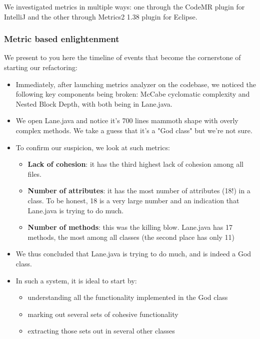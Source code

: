 We investigated metrics in multiple ways: one through the CodeMR plugin for IntelliJ and the other through Metrics2 1.38 plugin for Eclipse.

\subsubsection{Metric based enlightenment}

We present to you here the timeline of events that become the cornerstone of starting our refactoring:

\begin{itemize}

\item Immediately, after launching metrics analyzer on the codebase, we noticed the following key components being broken: McCabe cyclomatic complexity and Nested Block Depth, with both being in Lane.java.
\item We open Lane.java and notice it's 700 lines mammoth shape with overly complex methods. We take a guess that it's a "God class" but we're not sure.
\item To confirm our suspicion, we look at such metrics:

\begin{itemize}
\item \textbf{Lack of cohesion}: it has the third highest lack of cohesion among all files.
\item \textbf{Number of attributes}: it has the most number of attributes (18!) in a class. To be honest, 18 is a very large number and an indication that Lane.java is trying to do much.
\item \textbf{Number of methods}: this was the killing blow. Lane.java has 17 methods, the most among all classes (the second place has only 11)
\end{itemize}

\item We thus concluded that Lane.java is trying to do much, and is indeed a God class.
\item In such a system, it is ideal to start by:
\begin{itemize}
\item understanding all the functionality implemented in the God class
\item marking out several sets of cohesive functionality
\item extracting those sets out in several other classes
\end{itemize}


\end{itemize}
